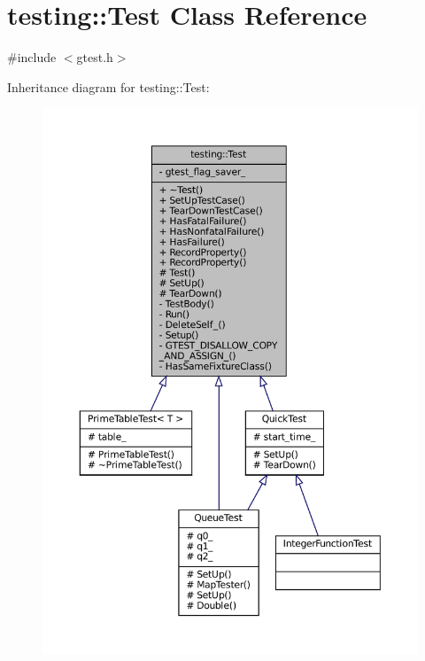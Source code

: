 \hypertarget{classtesting_1_1Test}{}\section{testing\+:\+:Test Class Reference}
\label{classtesting_1_1Test}


{\ttfamily \#include $<$gtest.\+h$>$}



Inheritance diagram for testing\+:\+:Test\+:
\nopagebreak
\begin{figure}[H]
\begin{center}
\leavevmode
\includegraphics[width=350pt]{classtesting_1_1Test__inherit__graph}
\end{center}
\end{figure}


